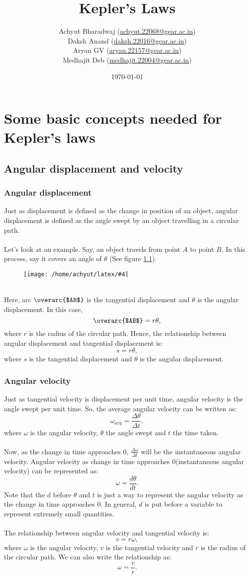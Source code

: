 \documentclass[a4paper]{report}
\title{Kepler's Laws}
\author{Achyut Bharadwaj (\href{mailto:achyut.22068@gear.ac.in}{achyut.22068@gear.ac.in})\\ 
  Daksh Anand (\href{mailto:daksh.22016@gear.ac.in}{daksh.22016@gear.ac.in})\\
  Aryan GV (\href{mailto:aryan.22157@gear.ac.in}{aryan.22157@gear.ac.in})\\ 
Medhajit Deb (\href{mailto:medhajit.22004@gear.ac.in}{medhajit.22004@gear.ac.in})}
\date{\today}
\newcommand{\mkfig}[5]{
  \begin{figure}[#1]
    \centering
    \texttt{[image: /home/achyut/latex/\#4]}
    \caption{\centering{#5}}
    \label{fig.#2}
  \end{figure}
}
\begin{document}
\maketitle
\tableofcontents
\pagebreak
\listoffigures
\noindent

\chapter{Some basic concepts needed for Kepler's laws}
\section{Angular displacement and velocity}
\subsection{Angular displacement}
Just as displacement is defined as the change in position of an object, angular displacement is defined as
the angle swept by an object travelling in a circular path.\\\\
Let's look at an example. Say, an object travels from point $A$ to point $B$. In this process, say it 
covers an angle of $\theta$ (See figure \ref{fig.4}).
\mkfig{h!}{4}{2}{presentation.4.png}{An example} \\
Here, arc \(\overarc{$AB$}\) is the tangential displacement and $\theta$ is the angular displacement.
In this case, $$\text{\(\overarc{$AB$}\)}=r\theta,$$ where $r$ is the radius of the circular path.
Hence, the relationship between angular displacement and tangential displacement is: $$s=r\theta,$$
where $s$ is the tangential displacement and $\theta$ is the angular displacement.

\subsection{Angular velocity}
Just as tangential velocity is displacement per unit time, angular velocity is the angle swept per unit time.
So, the average angular velocity can be written as: $$\omega_{avg}=\frac{\Delta \theta}{\Delta t},$$
where $\omega$ is the angular velocity, $\theta$ the angle swept and $t$ the time taken. \\\\
Now, as the change in time approaches 0, $\frac{\Delta \omega}{\Delta t}$ will be the instantaneous angular
velocity. Angular velocity as change in time approaches 0(instantaneous angular velocity) can be 
represented as: $$\omega=\frac{d\theta}{dt}.$$ Note that the $d$ before $\theta$ and $t$ is just a way to
represent the angular velocity as the change in time approaches 0. In general, $d$ is put before a variable to 
represent extremely small quantities.\\\\
The relationship between angular velocity and tangential velocity is: $$v=r\omega,$$
where $\omega$ is the angular velocity, $v$ is the tangential velocity and $r$ is the radius of the circular path.
We can also write the relationship as: $$\omega=\frac{v}{r}.$$
\end{document}
